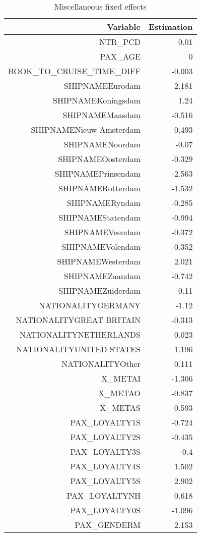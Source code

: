 \documentclass{article}
\begin{document}
\begin{table}
	\centering 
	\begin{tabular}{rr}
		Variable & Estimation \\
		\hline \hline 
		NTR\_PCD & 0.01 \\
		PAX\_AGE & 0 \\
		BOOK\_TO\_CRUISE\_TIME\_DIFF & -0.003 \\
		SHIPNAMEEurodam & 2.181 \\
		SHIPNAMEKoningsdam & 1.24 \\
		SHIPNAMEMaasdam & -0.516 \\
		SHIPNAMENieuw  Amsterdam & 0.493 \\
		SHIPNAMENoordam & -0.07 \\
		SHIPNAMEOosterdam & -0.329 \\
		SHIPNAMEPrinsendam & -2.563 \\
		SHIPNAMERotterdam & -1.532 \\
		SHIPNAMERyndam & -0.285 \\
		SHIPNAMEStatendam & -0.994 \\
		SHIPNAMEVeendam & -0.372 \\
		SHIPNAMEVolendam & -0.352 \\
		SHIPNAMEWesterdam & 2.021 \\
		SHIPNAMEZaandam & -0.742 \\
		SHIPNAMEZuiderdam & -0.11 \\
		NATIONALITYGERMANY & -1.12 \\
		NATIONALITYGREAT BRITAIN & -0.313 \\
		NATIONALITYNETHERLANDS & 0.023 \\
		NATIONALITYUNITED STATES & 1.196 \\
		NATIONALITYOther & 0.111 \\
		X\_METAI & -1.306 \\
		X\_METAO & -0.837 \\
		X\_METAS & 0.593 \\
		PAX\_LOYALTY1S & -0.724 \\
		PAX\_LOYALTY2S & -0.435 \\
		PAX\_LOYALTY3S & -0.4 \\
		PAX\_LOYALTY4S & 1.502 \\
		PAX\_LOYALTY5S & 2.902 \\
		PAX\_LOYALTYNH & 0.618 \\
		PAX\_LOYALTY0S & -1.096 \\
		PAX\_GENDERM & 2.153 \\
		\hline 
		\hline 
	\end{tabular}
	\caption{Miscellaneous fixed effects}
\end{table}
\end{document}
